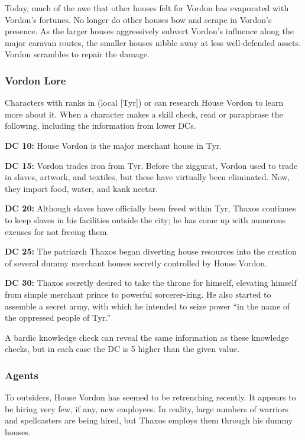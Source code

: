 Today, much of the awe that other houses felt for Vordon has evaporated with Vordon's fortunes. No longer do other houses bow and scrape in Vordon's presence. As the larger houses aggressively subvert Vordon's influence along the major caravan routes, the smaller houses nibble away at less well-defended assets. Vordon scrambles to repair the damage.

\subsubsection{Vordon Lore}
Characters with ranks in  (local [Tyr]) or  can research House Vordon to learn more about it. When a character makes a skill check, read or paraphrase the following, including the information from lower DCs.

\textbf{DC 10:} House Vordon is the major merchant house in Tyr.

\textbf{DC 15:} Vordon trades iron from Tyr. Before the ziggurat, Vordon used to trade in slaves, artwork, and textiles, but these have virtually been eliminated. Now, they import food, water, and kank nectar.

\textbf{DC 20:} Although slaves have officially been freed within Tyr, Thaxos continues to keep slaves in his facilities outside the city; he has come up with numerous excuses for not freeing them.

\textbf{DC 25:} The patriarch Thaxos began diverting house resources into the creation of several dummy merchant houses secretly controlled by House Vordon.

\textbf{DC 30:} Thaxos secretly desired to take the throne for himself, elevating himself from simple merchant prince to powerful sorcerer-king. He also started to assemble a secret army, with which he intended to seize power ``in the name of the oppressed people of Tyr.''


A bardic knowledge check can reveal the same information as these knowledge checks, but in each case the DC is 5 higher than the given value.

\subsubsection{Agents}
To outsiders, House Vordon has seemed to be retrenching recently. It appears to be hiring very few, if any, new employees. In reality, large numbers of warriors and spellcasters are being hired, but Thaxos employs them through his dummy houses.


